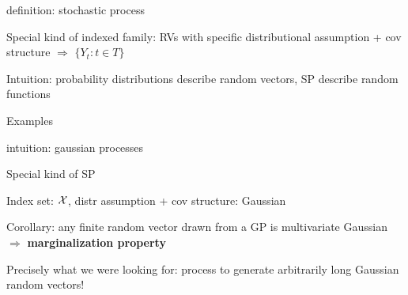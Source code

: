 \documentclass[11pt,compress,t,notes=noshow, xcolor=table]{beamer}
\begin{document}
\begin{framei}[sep=M]{definition: stochastic process}
\item Special kind of indexed family: RVs with specific distributional assumption + cov structure $\Rightarrow$ $\{Y_t: t \in T\}$
\item Intuition: probability distributions describe random vectors, SP describe random functions
\item Examples
\end{framei}


\begin{framei}[sep=L]{intuition: gaussian processes}
\item Special kind of SP 
\item Index set: $\mathcal{X}$, distr assumption + cov structure: Gaussian 
\item Corollary: any finite random vector drawn from a GP is multivariate Gaussian $\Rightarrow$ \textbf{marginalization property}
\vfill
{}
\vfill
\item Precisely what we were looking for: process to generate arbitrarily long Gaussian random vectors!
\end{framei}
\end{document}
